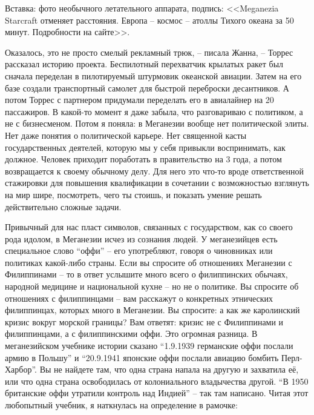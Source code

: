 Вставка: фото необычного летательного аппарата, подпись: <<Meganezia Starcraft отменяет расстояния. Европа -- космос -- атоллы Тихого океана за 50 минут. Подробности на сайте>>.

\begin{displayquote}
  Оказалось, это не просто смелый рекламный трюк, -- писала Жанна, -- Торрес рассказал историю проекта. Беспилотный перехватчик крылатых ракет был сначала переделан в пилотируемый штурмовик океанской авиации. Затем на его базе создали транспортный самолет для быстрой переброски десантников. А потом Торрес с партнером придумали переделать его в авиалайнер на 20 пассажиров. В какой-то момент я даже забыла, что разговариваю с политиком, а не с бизнесменом. Потом я поняла: в Меганезии вообще нет политической элиты. Нет даже понятия о политической карьере. Нет священной касты государственных деятелей, которую мы у себя привыкли воспринимать, как должное. Человек приходит поработать в правительство на 3 года, а потом возвращается к своему обычному делу. Для него это что-то вроде ответственной стажировки для повышения квалификации в сочетании с возможностью взглянуть на мир шире, посмотреть, чего ты стоишь, и показать умение решать действительно сложные задачи.

Привычный для нас пласт символов, связанных с государством, как со своего рода идолом, в Меганезии исчез из сознания людей. У меганезийцев есть специальное слово ``оффи'' -- его употребляют, говоря о чиновниках или политиках какой-либо страны. Если вы спросите об отношениях Меганезии с Филиппинами -- то в ответ услышите много всего о филиппинских обычаях, народной медицине и национальной кухне -- но не о политике. Вы спросите об отношениях с филиппинцами -- вам расскажут о конкретных этнических филиппинцах, которых много в Меганезии. Вы спросите: а как же каролинский кризис вокруг морской границы? Вам ответят: кризис не с Филиппинами и филиппинцами, а с филиппинскими оффи. Это огромная разница. В меганезийском учебнике истории сказано ``1.9.1939 германские оффи послали армию в Польшу'' и ``20.9.1941 японские оффи послали авиацию бомбить Перл-Харбор''. Вы не найдете там, что одна страна напала на другую и захватила её, или что одна страна освободилась от колониального владычества другой. ``В 1950 британские оффи утратили контроль над Индией'' -- так там написано. Читая этот любопытный учебник, я наткнулась на определение в рамочке:


\end{displayquote}
